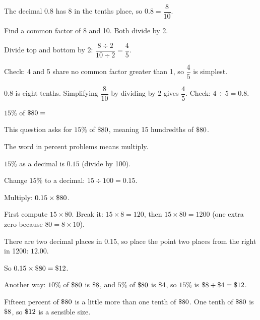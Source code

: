 \begin{steps}
  \item The decimal $0.8$ has 8 in the tenths place, so $0.8 = \dfrac{8}{10}$.
  \item Find a common factor of 8 and 10. Both divide by 2.
  \item Divide top and bottom by 2: $\dfrac{8 \div 2}{10 \div 2} = \dfrac{4}{5}$.
  \item Check: 4 and 5 share no common factor greater than 1, so $\dfrac{4}{5}$ is simplest.
\end{steps}


$0.8$ is eight tenths. Simplifying $\dfrac{8}{10}$ by dividing by 2 gives
$\dfrac{4}{5}$. Check: $4 \div 5 = 0.8$.


$15\%$ of $\$80 = $\ansblank[1.8cm]


This question asks for $15\%$ of $\$80$, meaning 15 hundredths of $\$80$.

\begin{words}
  \item The word in percent problems means multiply.
  \item $15\%$ as a decimal is $0.15$ (divide by 100).
\end{words}

\begin{steps}
  \item Change $15\%$ to a decimal: $15 \div 100 = 0.15$.
  \item Multiply: $0.15 \times \$80$.
  \item First compute $15 \times 80$. Break it: $15 \times 8 = 120$, then
        $15 \times 80 = 1200$ (one extra zero because $80 = 8 \times 10$).
  \item There are two decimal places in $0.15$, so place the point two places from
        the right in 1200: $12.00$.
  \item So $0.15 \times \$80 = \$12$.
  \item Another way: $10\%$ of $\$80$ is $\$8$, and $5\%$ of $\$80$
        is $\$4$, so $15\%$ is $\$8 + \$4 = \$12$.
\end{steps}


Fifteen percent of $\$80$ is a little more than one tenth of $\$80$. One
tenth of $\$80$ is $\$8$, so $\$12$ is a sensible size.
